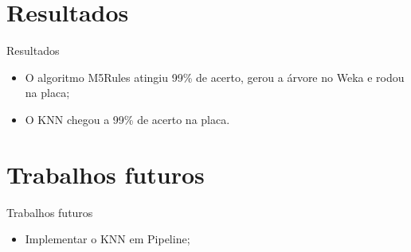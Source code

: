 \documentclass[11pt]{beamer}
\begin{document}

\section{Resultados}
\begin{frame}{Resultados}

\begin{itemize}
	\item O algoritmo M5Rules atingiu 99\% de acerto, gerou a árvore no
	Weka e rodou na placa;
	\item O KNN chegou a 99\% de acerto na placa.
\end{itemize}

\end{frame}

\section{Trabalhos futuros}
\begin{frame}{Trabalhos futuros}

\begin{itemize}
	\item Implementar o KNN em Pipeline;
\end{itemize}

\end{frame}
\end{document}
